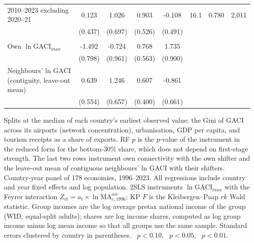 \begin{table}[H]
\begin{minipage}{\linewidth}
{\begin{tabular}{lcccccrr}
2010--2023 excluding 2020--21 & 0.123 & 1.026 & 0.903\sym{*} & -0.108 & 16.1 & 0.780 & 2{,}011 \\
 & (0.437) & (0.697) & (0.526) & (0.491) \\
\addlinespace
\multicolumn{8}{l}{\emph{Own and contiguous neighbours' connectivity, jointly instrumented (bottom-30\% share)}}\\
Own $\ln\mathrm{GACI}_{max}$ & -1.492\sym{*} & -0.724 & 0.768 & 1.735\sym{*} \\
 & (0.798) & (0.961) & (0.563) & (0.900) \\
Neighbours' ln GACI (contiguity, leave-out mean) & 0.639 & 1.246\sym{*} & 0.607 & -0.861 \\
 & (0.554) & (0.657) & (0.400) & (0.661) \\
\bottomrule
\end{tabular}}
\par\vspace{3pt}\begin{flushleft}\footnotesize Splits at the median of each country's earliest observed value: the Gini of GACI across its airports (network concentration), urbanisation, GDP per capita, and tourism receipts as a share of exports. RF $p$ is the $p$-value of the instrument in the reduced form for the bottom-30\% share, which does not depend on first-stage strength. The last two rows instrument own connectivity with the own shifter and the leave-out mean of contiguous neighbours' ln GACI with their shifters. Country-year panel of 178 economies, 1996--2023. All regressions include country and year fixed effects and log population. 2SLS instruments $\ln\mathrm{GACI}_{max}$ with the Feyrer interaction $Z_{ct}=a_t\times\ln\mathrm{MA}^{air}_{c,1996}$; KP $F$ is the Kleibergen--Paap $rk$ Wald statistic. Group incomes are the log average pretax national income of the group (WID, equal-split adults); shares are log income shares, computed as log group income minus log mean income so that all groups use the same sample. Standard errors clustered by country in parentheses. \sym{*}~$p<0.10$, \sym{**}~$p<0.05$, \sym{***}~$p<0.01$.\end{flushleft}
\end{minipage}
\end{table}
